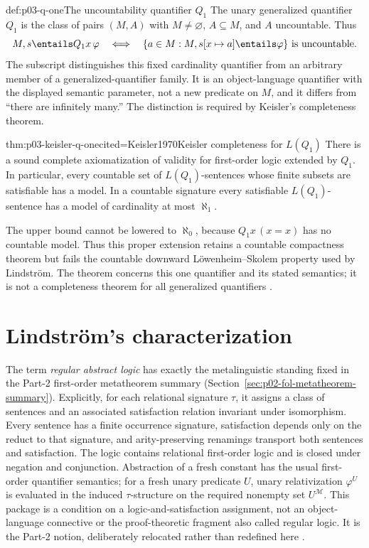 \begin{hbdefinition}{def:p03-q-one}{The uncountability quantifier \(Q_1\)}
The unary generalized quantifier \(Q_1\) is the class of pairs \((M,A)\) with
\(M\ne\varnothing\), \(A\subseteq M\), and \(A\) uncountable.  Thus
\[
 M,s\entails Q_1x\,\varphi
 \quad\Longleftrightarrow\quad
 \{a\in M:M,s[x\mapsto a]\entails\varphi\}\text{ is uncountable}.
\]
The subscript distinguishes this fixed cardinality quantifier from an
arbitrary member of a generalized-quantifier family.  It is an
object-language quantifier with the displayed semantic parameter, not a new
predicate on \(M\), and it differs from ``there are infinitely many.''  The
distinction is required by Keisler's completeness theorem.
\end{hbdefinition}

\begin{hbtheorem}{thm:p03-keisler-q-one}{cited=Keisler1970}{Keisler completeness for \(L(Q_1)\)}
There is a sound complete axiomatization of validity for first-order logic
extended by \(Q_1\).  In particular, every countable set of
\(L(Q_1)\)-sentences whose finite subsets are satisfiable has a model.  In a
countable signature every satisfiable \(L(Q_1)\)-sentence has a model of
cardinality at most \(\aleph_1\).
\end{hbtheorem}

The upper bound cannot be lowered to \(\aleph_0\), because
\(Q_1x\,(x=x)\) has no countable model.  Thus this proper extension retains a
countable compactness theorem but fails the countable downward
L\"owenheim--Skolem property used by Lindstr\"om.  The theorem concerns this
one quantifier and its stated semantics; it is not a completeness theorem for
all generalized quantifiers \cite{Mostowski1957,Lindstrom1966,Keisler1970}.

\section{Lindstr\"om's characterization}
\label{sec:p03-lindstrom}

The term \emph{regular abstract logic} has exactly the metalinguistic standing
fixed in the Part-2 first-order metatheorem summary
(Section~\ref{sec:p02-fol-metatheorem-summary}).  Explicitly, for each
relational signature \(\tau\), it assigns a class of sentences and an
associated satisfaction relation invariant under isomorphism.  Every sentence
has a finite occurrence signature, satisfaction depends only on the reduct to
that signature, and arity-preserving renamings transport both sentences and
satisfaction.  The logic contains relational first-order logic and is closed
under negation and conjunction.  Abstraction of a fresh constant has the usual
first-order quantifier semantics; for a fresh unary predicate \(U\), unary
relativization \(\varphi^U\) is evaluated in the induced \(\tau\)-structure on
the required nonempty set \(U^{\mathcal M}\).  This package is a condition on a
logic-and-satisfaction assignment, not an object-language connective or the
proof-theoretic fragment also called regular logic.  It is the Part-2 notion,
deliberately relocated rather than redefined here
\cite[Chapter~XIII, \S1]{EbbinghausFlumThomas1994}.

